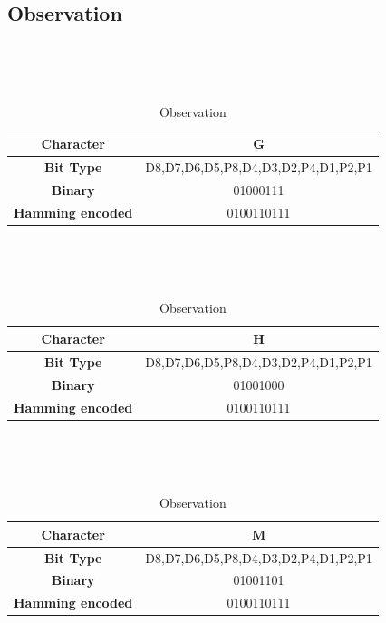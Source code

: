 \documentclass{article}
\numberwithin{equation}{section}
\numberwithin{figure}{section}
\numberwithin{table}{section}
\begin{document}
\subsection{Observation}
\begin{table}[h!]
        \centering
        \caption{Observation}\
        
        \
        \begin{tabular}{|c|c|}
            \hline
            \textbf{Character} & G \\
            \hline
            \textbf{Bit Type} & D8,D7,D6,D5,P8,D4,D3,D2,P4,D1,P2,P1 \\
            \hline
            \textbf{Binary} &  01000111 \\
            \hline
            \textbf{Hamming encoded} &  0100110111 \\
            \hline
            
        \end{tabular}
        
\end{table}
\begin{table}[h!]
        \centering
        \caption{Observation}\
       
        \
        \begin{tabular}{|c|c|}
            \hline
            \textbf{Character} & H \\
            \hline
            \textbf{Bit Type} & D8,D7,D6,D5,P8,D4,D3,D2,P4,D1,P2,P1 \\
            \hline
            \textbf{Binary} &  01001000 \\
            \hline
            \textbf{Hamming encoded} &  0100110111 \\
            \hline
            
        \end{tabular}
        
\end{table}
\begin{table}[h!]
        \centering
        \caption{Observation}\
       
        \
        \begin{tabular}{|c|c|}
            \hline
            \textbf{Character} & M \\
            \hline
            \textbf{Bit Type} & D8,D7,D6,D5,P8,D4,D3,D2,P4,D1,P2,P1 \\
            \hline
            \textbf{Binary} &  01001101 \\
            \hline
            \textbf{Hamming encoded} &  0100110111 \\
            \hline
            
        \end{tabular}
        
\end{table}
\end{document}
